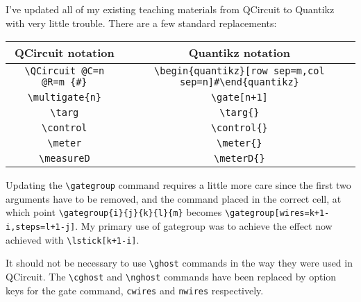 \documentclass[aps,pra,10pt,nofootinbib]{revtex4}
\begin{document}
I've updated all of my existing teaching materials from QCircuit to Quantikz with very little trouble. There are a few standard replacements:
\begin{center}
\begin{tabular}{c|c}
QCircuit notation & Quantikz notation \\
\hline
\verb!\QCircuit @C=n @R=m {#}! & \verb!\begin{quantikz}[row sep=m,col sep=n]#\end{quantikz}!	\\
\verb!\multigate{n}! & \verb!\gate[n+1]!	\\
\verb!\targ! & \verb!\targ{}! \\
\verb!\control! & \verb!\control{}! \\
\verb!\meter! & \verb!\meter{}! \\
\verb!\measureD! & \verb!\meterD{}! \\
\end{tabular}
\end{center}
Updating the \verb!\gategroup! command requires a little more care since the first two arguments have to be removed, and the command placed in the correct cell, at which point \verb!\gategroup{i}{j}{k}{l}{m}! becomes \verb!\gategroup[wires=k+1-i,steps=l+1-j]!. My primary use of gategroup was to achieve the effect now achieved with \verb!\lstick[k+1-i]!.

It should not be necessary to use \verb!\ghost! commands in the way they were used in QCircuit. The \verb!\cghost! and \verb!\nghost! commands have been replaced by option keys for the gate command, \verb!cwires! and \verb!nwires! respectively.
\end{document}
